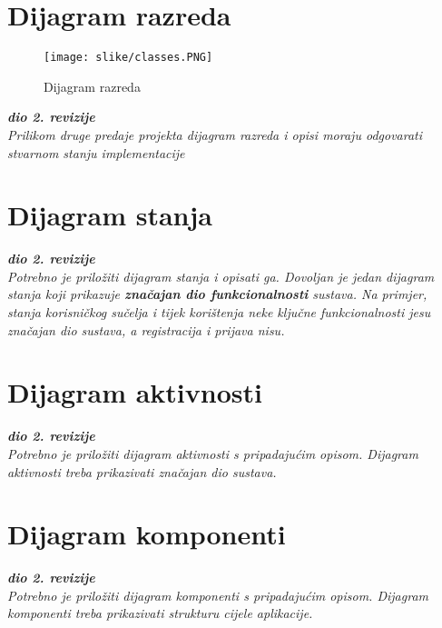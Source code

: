 			\eject
			
			
		\section{Dijagram razreda}
		
			\begin{figure}[H]
				\texttt{[image: slike/classes.PNG]}
				\centering
				\caption{Dijagram razreda}
				\label{fig:razredi}
			\end{figure}
			
			\textbf{\textit{dio 2. revizije}}\\			
			
			\textit{Prilikom druge predaje projekta dijagram razreda i opisi moraju odgovarati stvarnom stanju implementacije}
			
			
			
			\eject
		
		\section{Dijagram stanja}
			
			
			\textbf{\textit{dio 2. revizije}}\\
			
			\textit{Potrebno je priložiti dijagram stanja i opisati ga. Dovoljan je jedan dijagram stanja koji prikazuje \textbf{značajan dio funkcionalnosti} sustava. Na primjer, stanja korisničkog sučelja i tijek korištenja neke ključne funkcionalnosti jesu značajan dio sustava, a registracija i prijava nisu. }
			
			
			\eject 
		
		\section{Dijagram aktivnosti}
			
			\textbf{\textit{dio 2. revizije}}\\
			
			 \textit{Potrebno je priložiti dijagram aktivnosti s pripadajućim opisom. Dijagram aktivnosti treba prikazivati značajan dio sustava.}
			
			\eject
		\section{Dijagram komponenti}
		
			\textbf{\textit{dio 2. revizije}}\\
		
			 \textit{Potrebno je priložiti dijagram komponenti s pripadajućim opisom. Dijagram komponenti treba prikazivati strukturu cijele aplikacije.}